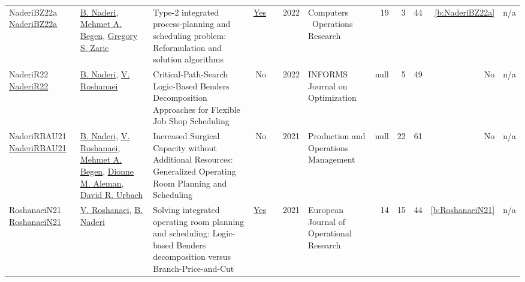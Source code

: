 {\begin{longtable}{>{\raggedright\arraybackslash}p{3cm}>{\raggedright\arraybackslash}p{6cm}>{\raggedright\arraybackslash}p{6.5cm}rrrp{2.5cm}rrrrr}
NaderiBZ22a \href{http://dx.doi.org/10.1016/j.cor.2022.105728}{NaderiBZ22a} & \hyperref[auth:a732]{B. Naderi}, \hyperref[auth:a843]{Mehmet A. Begen}, \hyperref[auth:a845]{Gregory S. Zaric} & Type-2 integrated process-planning and scheduling problem: Reformulation and solution algorithms & \href{../works/NaderiBZ22a.pdf}{Yes} & \cite{NaderiBZ22a} & 2022 & Computers \  Operations Research & 19 & 3 & 44 & \ref{b:NaderiBZ22a} & n/a\\
NaderiR22 \href{http://dx.doi.org/10.1287/ijoo.2021.0056}{NaderiR22} & \hyperref[auth:a732]{B. Naderi}, \hyperref[auth:a734]{V. Roshanaei} & Critical-Path-Search Logic-Based Benders Decomposition Approaches for Flexible Job Shop Scheduling & No & \cite{NaderiR22} & 2022 & INFORMS Journal on Optimization & null & 5 & 49 & No & n/a\\
NaderiRBAU21 \href{http://dx.doi.org/10.1111/poms.13397}{NaderiRBAU21} & \hyperref[auth:a732]{B. Naderi}, \hyperref[auth:a734]{V. Roshanaei}, \hyperref[auth:a843]{Mehmet A. Begen}, \hyperref[auth:a902]{Dionne M. Aleman}, \hyperref[auth:a903]{David R. Urbach} & Increased Surgical Capacity without Additional Resources: Generalized Operating Room Planning and Scheduling & No & \cite{NaderiRBAU21} & 2021 & Production and Operations Management & null & 22 & 61 & No & n/a\\
RoshanaeiN21 \href{http://dx.doi.org/10.1016/j.ejor.2020.12.004}{RoshanaeiN21} & \hyperref[auth:a734]{V. Roshanaei}, \hyperref[auth:a732]{B. Naderi} & Solving integrated operating room planning and scheduling: Logic-based Benders decomposition versus Branch-Price-and-Cut & \href{../works/RoshanaeiN21.pdf}{Yes} & \cite{RoshanaeiN21} & 2021 & European Journal of Operational Research & 14 & 15 & 44 & \ref{b:RoshanaeiN21} & n/a\\
\end{longtable}
}

\clearpage
